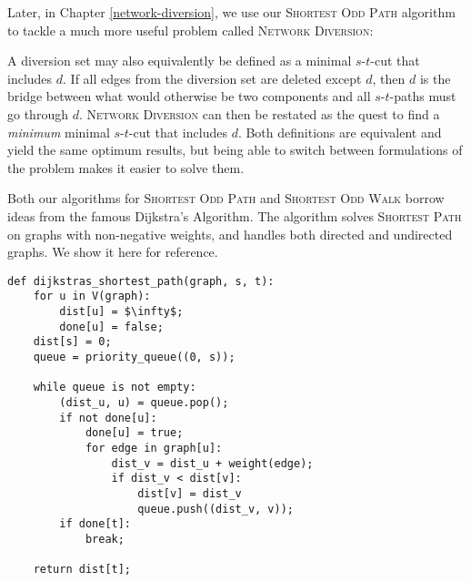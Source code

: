 Later, in Chapter \ref{network-diversion}, we use our \textsc{Shortest Odd Path} algorithm to tackle a much more useful problem called \textsc{Network Diversion}:


A diversion set may also equivalently be defined as a minimal $s$-$t$-cut that includes $d$. If all edges from the diversion set are deleted except $d$, then $d$ is the bridge between what would otherwise be two components and all $s$-$t$-paths must go through $d$. \textsc{Network Diversion} can then be restated as the quest to find a \emph{minimum} minimal $s$-$t$-cut that includes $d$. Both definitions are equivalent and yield the same optimum results, but being able to switch between formulations of the problem makes it easier to solve them.

Both our algorithms for \textsc{Shortest Odd Path} and \textsc{Shortest Odd Walk} borrow ideas from the famous Dijkstra's Algorithm. The algorithm solves \textsc{Shortest Path} on graphs with non-negative weights, and handles both directed and undirected graphs. We show it here for reference.

\begin{lstlisting}[caption={Dijkstra's Algorithm for Shortest Path},label=Listing,mathescape=true]
def dijkstras_shortest_path(graph, s, t):
    for u in V(graph):
        dist[u] = $\infty$;
        done[u] = false;
    dist[s] = 0;
    queue = priority_queue((0, s));

    while queue is not empty:
        (dist_u, u) = queue.pop();
        if not done[u]:
            done[u] = true;
            for edge in graph[u]:
                dist_v = dist_u + weight(edge);
                if dist_v < dist[v]:
                    dist[v] = dist_v
                    queue.push((dist_v, v));
        if done[t]:
            break;

    return dist[t];
\end{lstlisting}

